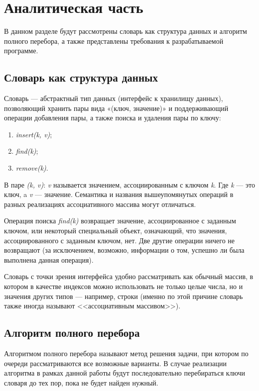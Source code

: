 \chapter{Аналитическая часть}
В данном разделе будут рассмотрены словарь как структура данных и алгоритм полного перебора, а также представлены требования к разрабатываемой программе.

\section{Словарь как структура данных}

Словарь \cite{dict} --- абстрактный тип данных (интерфейс к хранилищу данных), позволяющий хранить пары вида «(ключ, значение)» и поддерживающий операции добавления пары, а также поиска и удаления пары по ключу:
\begin{enumerate}[label=\arabic*)]
	\item \textit{insert(k, v)};
	\item \textit{find(k)};
	\item \textit{remove(k)}.
\end{enumerate}

В паре \textit{(k, v)}: \textit{v} называется значением, ассоциированным с ключом \textit{k}. Где \textit{k} — это ключ, a \textit{v} — значение. Семантика и названия вышеупомянутых операций в разных реализациях ассоциативного массива могут отличаться.

Операция поиска \textit{find(k)} возвращает значение, ассоциированное с заданным ключом, или некоторый специальный объект, означающий, что значения, ассоциированного с заданным ключом, нет. Две другие операции ничего не возвращают (за исключением, возможно, информации о том, успешно ли была выполнена данная операция).

Словарь с точки зрения интерфейса удобно рассматривать как обычный массив, в котором в качестве индексов можно использовать не только целые числа, но и значения других типов --- например, строки (именно по этой причине словарь также иногда называют <<ассоциативным массивом>>).

\section{Алгоритм полного перебора}
Алгоритмом полного перебора \cite{AI} называют метод решения задачи, при котором по очереди рассматриваются все возможные варианты. В случае реализации алгоритма в рамках данной работы будут последовательно перебираться ключи словаря до тех пор, пока не будет найден нужный.

